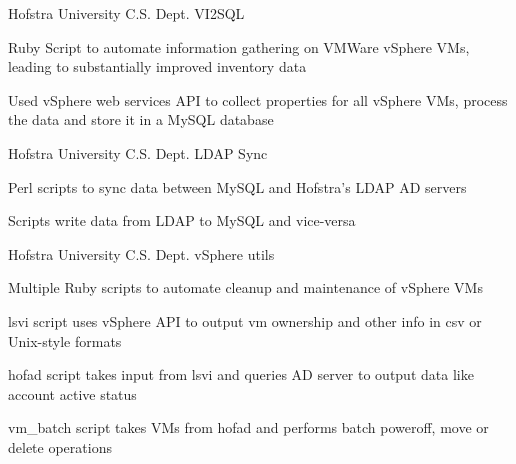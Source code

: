 \begin{cventries}

\cventry
    {Hofstra University C.S. Dept.} %
    {VI2SQL} %
    {}
    {}
    {
      \begin{cvitems} %
        \item {Ruby Script to automate information gathering on VMWare vSphere VMs, leading to substantially improved inventory data }
        \item {Used vSphere web services API to collect properties for all vSphere VMs, process the data and store it in a MySQL database}
      \end{cvitems}
    }

\cventry
    {Hofstra University C.S. Dept.} %
    {LDAP Sync} %
    {}
    {}
    {
      \begin{cvitems} %
        \item {Perl scripts to sync data between MySQL and Hofstra's LDAP AD servers}
        \item {Scripts write data from LDAP to MySQL and vice-versa}
      \end{cvitems}
    }

\cventry    
  {Hofstra University C.S. Dept.} %
  {vSphere utils} %
    {}
    {}
  {
    \begin{cvitems} %
    \item {Multiple Ruby scripts to automate cleanup and maintenance of vSphere VMs}
    \item {lsvi script uses vSphere API to output vm ownership and other info in csv or Unix-style formats}
    \item {hofad script takes input from lsvi and queries AD server to output data like account active status}
    \item {vm\_batch script takes VMs from hofad and performs batch poweroff, move or delete operations}
    \end{cvitems}
 }

\end{cventries}
